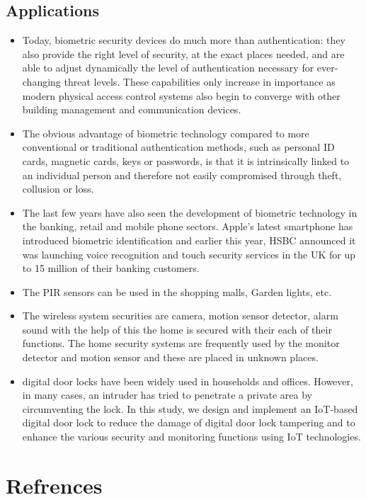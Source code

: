 \documentclass[twoside,a4paper,16pt]{book}
\begin{document}
{{ \section{Applications}
 \begin{itemize}
 	\item  Today, biometric security devices do much more than authentication: they also provide the right level of security, at the exact places needed, and are able to adjust dynamically the level of authentication necessary for ever-changing threat levels. These capabilities only increase in importance as modern physical access control systems also begin to converge with other building management and communication devices.
 	\item The obvious advantage of biometric technology compared to more conventional or traditional authentication methods, such as personal ID cards, magnetic cards, keys or passwords, is that it is intrinsically linked to an individual person and therefore not easily compromised through theft, collusion or loss.
 	\item The last few years have also seen the development of biometric technology in the banking, retail and mobile phone sectors. Apple’s latest smartphone has introduced biometric identification and earlier this year, HSBC announced it was launching voice recognition and touch security services in the UK for up to 15 million of their banking customers.
 	\item The PIR sensors can be used in the shopping malls, Garden lights, etc.
 	\item The wireless system securities are camera, motion sensor detector, alarm sound with the help of this the home is secured with their each of their functions. The home security systems are frequently used by the monitor detector and motion sensor and these are placed in unknown places.
 	\item digital door locks have been widely used in households and offices. However, in many cases, an intruder has tried to penetrate a private area by circumventing the lock. In this study, we design and implement an IoT-based digital door lock to reduce the damage of digital door lock tampering and to enhance the various security and monitoring functions using IoT technologies.
 \end{itemize}

\chapter{Refrences}


}}
\end{document}

